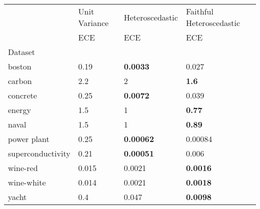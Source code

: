 \begin{tabular}{l|l|l|l}
\toprule
 & Unit Variance & Heteroscedastic & Faithful Heteroscedastic \\
 & ECE & ECE & ECE \\
Dataset &  &  &  \\
\midrule
boston & 0.19 & \bfseries 0.0033 & 0.027 \\
carbon & 2.2 & 2 & \bfseries 1.6 \\
concrete & 0.25 & \bfseries 0.0072 & 0.039 \\
energy & 1.5 & 1 & \bfseries 0.77 \\
naval & 1.5 & 1 & \bfseries 0.89 \\
power plant & 0.25 & \bfseries 0.00062 & 0.00084 \\
superconductivity & 0.21 & \bfseries 0.00051 & 0.006 \\
wine-red & 0.015 & 0.0021 & \bfseries 0.0016 \\
wine-white & 0.014 & 0.0021 & \bfseries 0.0018 \\
yacht & 0.4 & 0.047 & \bfseries 0.0098 \\
\bottomrule
\end{tabular}
